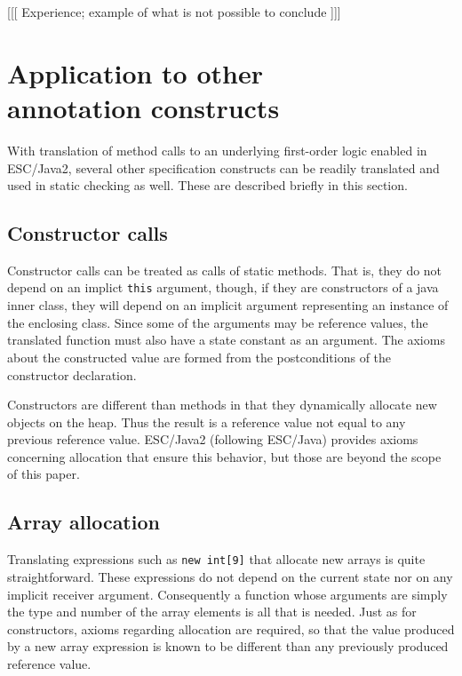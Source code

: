 \documentclass{sig-alternate}
\begin{document}
[[[ Experience; example of what is not possible to conclude ]]]

\section{Application to other \\ annotation constructs}

With translation of method calls to an underlying first-order logic enabled in ESC/Java2, 
several other specification constructs can be readily translated and used in static checking as 
well.  These are described briefly in this section.
 
\subsection{Constructor calls}

Constructor calls can be treated as calls of static methods.  That is, they do not depend on an
implict \texttt{this} argument, though, if they are constructors of a java inner class, they will depend 
on an implicit argument representing an instance of the enclosing class.  Since some of the 
arguments may be reference values, the translated function must also have a state constant
as an argument.  The axioms about the constructed value are formed from the postconditions
of the constructor declaration.

Constructors are different than methods in that they dynamically allocate new objects on the 
heap.  Thus the result is a reference value not equal to any previous reference value.  ESC/Java2
(following ESC/Java) provides axioms concerning allocation that ensure this behavior, but 
those are beyond the scope of this paper.

\subsection{Array allocation}

Translating expressions such as \texttt{new int[9]} that allocate new arrays is quite straightforward.
These expressions do not depend on the current state nor on any implicit receiver argument.
Consequently a function whose arguments are simply the type and number of the array 
elements is all that is needed.
Just as for constructors, axioms regarding allocation are required, 
so that the value produced by a new array
expression is known to be different than any previously produced reference value.
\end{document}
